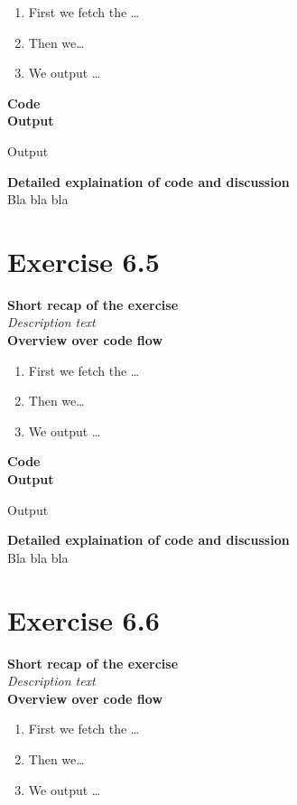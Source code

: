 \documentclass{article}
\newcommand\pythonstyle{\lstset{
language=python,
breaklines=true,
basicstyle=\ttfamily\small,
otherkeywords={1, 2, 3, 4, 5, 6, 7, 8 ,9 , 0, -, =, +, [, ], (, ), \{, \}, :, *, !},             %
keywordstyle=\color{blue},
emph={class, pass, in, for, while, if, is, elif, else, not, and, or, OR
    def, print, exec, break, continue, return},
emphstyle=\color{black}\bfseries,
emph={[2]True, False, None, self},
emphstyle=[2]\color{purple},
emph={[3]from, import, as},
emphstyle=[3]\color{blue},
stringstyle=\color{red},
frame=tb,
showstringspaces=false,
morecomment=[s]{"""}{"""},
commentstyle=\color{gray},
rulesepcolor=\color{blue},
title=\lstname
}}
\newcommand\pythonexternal[2][]{{
\pythonstyle
}}
\begin{document}
\begin{enumerate}
  \item First we fetch the \ldots
  \item Then we\ldots
  \item We output \ldots\\
\end{enumerate}

\textbf{Code}\\
\textbf{Output}
\begin{pythonOutput}
Output
\end{pythonOutput}
\textbf{Detailed explaination of code and discussion}\\
Bla bla bla
\section{Exercise 6.5}
\textbf{Short recap of the exercise}\\
\textit{Description text}\\

\textbf{Overview over code flow}\\

\begin{enumerate}
  \item First we fetch the \ldots
  \item Then we\ldots
  \item We output \ldots\\
\end{enumerate}

\textbf{Code}\\
\textbf{Output}
\begin{pythonOutput}
Output
\end{pythonOutput}
\textbf{Detailed explaination of code and discussion}\\
Bla bla bla
\section{Exercise 6.6}
\textbf{Short recap of the exercise}\\
\textit{Description text}\\

\textbf{Overview over code flow}\\

\begin{enumerate}
  \item First we fetch the \ldots
  \item Then we\ldots
  \item We output \ldots\\
\end{enumerate}
\end{document}
